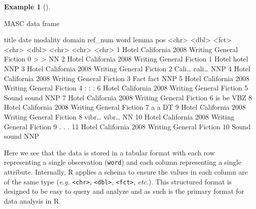 \documentclass[
  letterpaper,
  DIV=11,
  numbers=noendperiod]{scrreport}
\newenvironment{Shaded}{\begin{snugshade}}{\end{snugshade}}
\newcommand{\KeywordTok}[1]{\textcolor[rgb]{0.00,0.00,0.00}{#1}}
\newcommand{\NormalTok}[1]{\textcolor[rgb]{0.00,0.00,0.00}{#1}}
\theoremstyle{definition}
\newtheorem{example}{Example}[chapter]
\theoremstyle{remark}
\begin{document}
\begin{example}[]\protect\hypertarget{exm-masc-df}{}\label{exm-masc-df}

MASC data frame

\begin{Shaded}
\begin{Highlighting}[]
\NormalTok{   title             date modality domain          ref\_num word  lemma pos  }
\NormalTok{   \textless{}}\KeywordTok{chr}\NormalTok{\textgreater{}            \textless{}}\KeywordTok{dbl}\NormalTok{\textgreater{} \textless{}}\KeywordTok{fct}\NormalTok{\textgreater{}    \textless{}}\KeywordTok{chr}\NormalTok{\textgreater{}             \textless{}}\KeywordTok{dbl}\NormalTok{\textgreater{} \textless{}}\KeywordTok{chr}\NormalTok{\textgreater{} \textless{}}\KeywordTok{chr}\NormalTok{\textgreater{} \textless{}}\KeywordTok{chr}\NormalTok{\textgreater{}}
\NormalTok{ 1 Hotel California  2008 Writing  General Fiction       0 \textgreater{}     \textgreater{}     NN   }
\NormalTok{ 2 Hotel California  2008 Writing  General Fiction       1 Hotel hotel NNP  }
\NormalTok{ 3 Hotel California  2008 Writing  General Fiction       2 Cali… cali… NNP  }
\NormalTok{ 4 Hotel California  2008 Writing  General Fiction       3 Fact  fact  NNP  }
\NormalTok{ 5 Hotel California  2008 Writing  General Fiction       4 :     :     :    }
\NormalTok{ 6 Hotel California  2008 Writing  General Fiction       5 Sound sound NNP  }
\NormalTok{ 7 Hotel California  2008 Writing  General Fiction       6 is    be    VBZ  }
\NormalTok{ 8 Hotel California  2008 Writing  General Fiction       7 a     a     DT   }
\NormalTok{ 9 Hotel California  2008 Writing  General Fiction       8 vibr… vibr… NN   }
\NormalTok{10 Hotel California  2008 Writing  General Fiction       9 .     .     .    }
\NormalTok{11 Hotel California  2008 Writing  General Fiction      10 Sound sound NNP  }
\end{Highlighting}
\end{Shaded}

\end{example}

Here we see that the data is stored in a tabular format with each row
representing a single observation (\texttt{word}) and each column
representing a single attribute. Internally, R applies a schema to
ensure the values in each column are of the same type (\emph{e.g.}
\texttt{\textless{}chr\textgreater{}},
\texttt{\textless{}dbl\textgreater{}},
\texttt{\textless{}fct\textgreater{}}, \emph{etc.}). This structured
format is designed to be easy to query and analyze and as such is the
primary format for data analysis in R.
\end{document}

